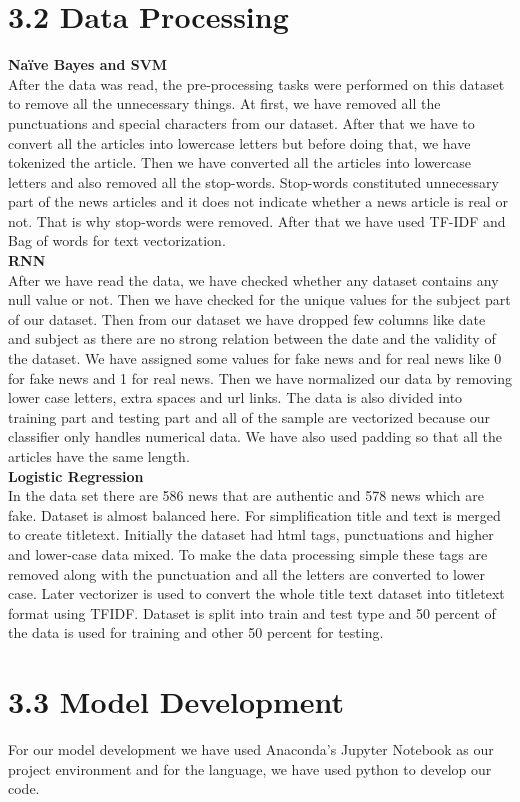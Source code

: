 \documentclass[12pt]{article}
\begin{document}
\section*{3.2 Data Processing}
\textbf{Naïve Bayes and SVM}\\
After the data was read, the pre-processing tasks were performed on this dataset to remove all the unnecessary things. At first, we have removed all the punctuations and special characters from our dataset. After that we have to convert all the articles into lowercase letters but before doing that, we have tokenized the article. Then we have converted all the articles into lowercase letters and also removed all the stop-words. Stop-words constituted unnecessary part of the news articles and it does not indicate whether a news article is real or not. That is why stop-words were removed. After that we have used TF-IDF and Bag of words for text vectorization.\\
\textbf{RNN}\\
After we have read the data, we have checked whether any dataset contains any null value or not. Then we have checked for the unique values for the subject part of our dataset. Then from our dataset we have dropped few columns like date and subject as there are no strong relation between the date and the validity of the dataset. We have assigned some values for fake news and for real news like 0 for fake news and 1 for real news. Then we have normalized our data by removing lower case letters, extra spaces and url links. The data is also divided into training part and testing part and all of the sample are vectorized because our classifier only handles numerical data. We have also used padding so that all the articles have the same length.\\
\textbf{Logistic Regression}\\
In the data set there are 586 news that are authentic and 578 news which are fake. Dataset is almost balanced here. For simplification title and text is merged to create titletext. Initially the dataset had html tags, punctuations and higher and lower-case data mixed. To make the data processing simple these tags are removed along with the punctuation and all the letters are converted to lower case. Later vectorizer is used to convert the whole title text dataset into titletext format using TFIDF. Dataset is split into train and test type and 50 percent of the data is used for training and other 50 percent for testing.



\section*{3.3 Model Development}
For our model development we have used Anaconda’s Jupyter Notebook as our project environment and for the language, we have used python to develop our code.
\end{document}
